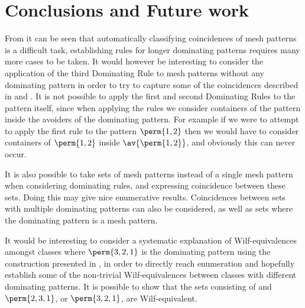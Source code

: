 \chapter{Conclusions and Future work}
From  it can be seen that automatically classifying
coincidences of mesh patterns is a difficult task, establishing rules for longer
dominating patterns requires many more cases to be taken. It would however
be interesting to consider the application of the third Dominating Rule to mesh
patterns without any dominating pattern in order to try to capture some of the
coincidences described in\textcite{DBLP:journals/combinatorics/HilmarssonJSVU15}
 and \textcite{DBLP:journals/corr/ClaessonTU14}.
It is not possible to apply the first and second Dominating Rules to the pattern
itself, since when applying the rules we consider containers of the pattern inside
the avoiders of the dominating pattern. For example if we were to attempt to apply
the first rule to the pattern \(\perm{1,2}\) then we would have to consider
containers of \(\perm{1,2}\) inside \(\av{\perm{1,2}}\), and obviously this can
never occur.

It is also possible to take sets of mesh patterns instead of a single mesh pattern
when considering dominating rules, and expressing coincidence between these sets.
Doing this may give nice enumerative results. Coincidences between sets with
multiple dominating patterns can also be considered, as well as sets where the
dominating pattern is a mesh pattern.

It would be interesting to consider a systematic explanation of Wilf-equivalences
amongst classes where \(\perm{3,2,1}\) is the dominating pattern using the
construction presented in \cite[Sec.~12]{2015arXiv151203226B}, in order to directly
reach enumeration and hopefully establish some of the non-trivial Wilf-equivalences
between classes with different dominating patterns. It is possible to show that
the sets consisting of  and
\(\perm{2,3,1}\), or \(\perm{3,2,1}\), are Wilf-equivalent.
